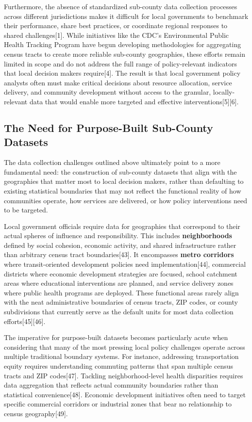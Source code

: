 \documentclass[
  letterpaper,
  DIV=11,
  numbers=noendperiod]{scrartcl}
\begin{document}
Furthermore, the absence of standardized sub-county data collection
processes across different jurisdictions makes it difficult for local
governments to benchmark their performance, share best practices, or
coordinate regional responses to shared challenges{[}1{]}. While
initiatives like the CDC's Environmental Public Health Tracking Program
have begun developing methodologies for aggregating census tracts to
create more reliable sub-county geographies, these efforts remain
limited in scope and do not address the full range of policy-relevant
indicators that local decision makers require{[}4{]}. The result is that
local government policy analysts often must make critical decisions
about resource allocation, service delivery, and community development
without access to the granular, locally-relevant data that would enable
more targeted and effective interventions{[}5{]}{[}6{]}.

\subsection{The Need for Purpose-Built Sub-County
Datasets}\label{the-need-for-purpose-built-sub-county-datasets}

The data collection challenges outlined above ultimately point to a more
fundamental need: the construction of sub-county datasets that align
with the geographies that matter most to local decision makers, rather
than defaulting to existing statistical boundaries that may not reflect
the functional reality of how communities operate, how services are
delivered, or how policy interventions need to be targeted.

Local government officials require data for geographies that correspond
to their actual spheres of influence and responsibility. This includes
\textbf{neighborhoods} defined by social cohesion, economic activity,
and shared infrastructure rather than arbitrary census tract
boundaries{[}43{]}. It encompasses \textbf{metro corridors} where
transit-oriented development policies need implementation{[}44{]},
commercial districts where economic development strategies are focused,
school catchment areas where educational interventions are planned, and
service delivery zones where public health programs are deployed. These
functional areas rarely align with the neat administrative boundaries of
census tracts, ZIP codes, or county subdivisions that currently serve as
the default units for most data collection efforts{[}45{]}{[}46{]}.

The imperative for purpose-built datasets becomes particularly acute
when considering that many of the most pressing local policy challenges
operate across multiple traditional boundary systems. For instance,
addressing transportation equity requires understanding commuting
patterns that span multiple census tracts and ZIP codes{[}47{]}.
Tackling neighborhood-level health disparities requires data aggregation
that reflects actual community boundaries rather than statistical
convenience{[}48{]}. Economic development initiatives often need to
target specific commercial corridors or industrial zones that bear no
relationship to census geography{[}49{]}.
\end{document}

